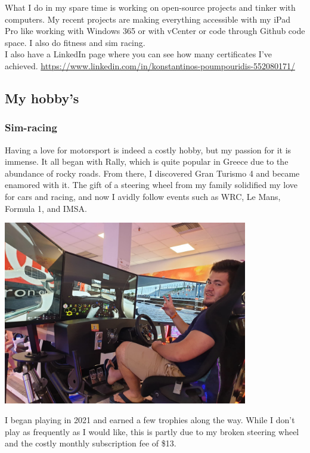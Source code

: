 \documentclass[12pt, letterpaper]{article}
\begin{document}
What I do in my spare time is working on open-source projects and tinker with computers. My recent projects are making everything accessible with my iPad Pro like working with Windows 365 or with vCenter or code through Github code space. I also do fitness and sim racing.
\hfill\break
\\
I also have a LinkedIn page where you can see how many certificates I've achieved.
\hfill\break
\url{https://www.linkedin.com/in/konstantinos-poumpouridis-552080171/}
\\
\newpage
\subsection{My hobby's}

\subsubsection{Sim-racing}
Having a love for motorsport is indeed a costly hobby, but my passion for it is immense. It all began with Rally, which is quite popular in Greece due to the abundance of rocky roads. From there, I discovered Gran Turismo 4 and became enamored with it. The gift of a steering wheel from my family solidified my love for cars and racing, and now I avidly follow events such as WRC, Le Mans, Formula 1, and IMSA.
\begin{center}
    \includegraphics[width=0.8\textwidth]{fotos/simracingkosta.jpeg}
\end{center}
I began playing in 2021 and earned a few trophies along the way. While I don't play as frequently as I would like, this is partly due to my broken steering wheel and the costly monthly subscription fee of \$13.
\end{document}
